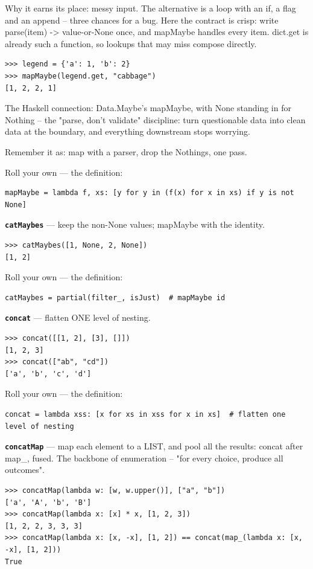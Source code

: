 \documentclass[10pt,letterpaper]{article}
\begin{document}
Why it earns its place: messy input. The alternative is a loop with an if, a flag and an append -- three chances for a bug. Here the contract is crisp: write parse(item) -> value-or-None once, and mapMaybe handles every item. dict.get is already such a function, so lookups that may miss compose directly.

\begin{lstlisting}[style=ex]
>>> legend = {'a': 1, 'b': 2}
>>> mapMaybe(legend.get, "cabbage")
[1, 2, 2, 1]
\end{lstlisting}

The Haskell connection: Data.Maybe's mapMaybe, with None standing in for Nothing -- the "parse, don't validate" discipline: turn questionable data into clean data at the boundary, and everything downstream stops worrying.


Remember it as: map with a parser, drop the Nothings, one pass.


Roll your own --- the definition:

\begin{lstlisting}[style=ex]
mapMaybe = lambda f, xs: [y for y in (f(x) for x in xs) if y is not None]
\end{lstlisting}
\textbf{\texttt{catMaybes}} --- keep the non-None values; mapMaybe with the identity.
\begin{lstlisting}[style=ex]
>>> catMaybes([1, None, 2, None])
[1, 2]
\end{lstlisting}

Roll your own --- the definition:

\begin{lstlisting}[style=ex]
catMaybes = partial(filter_, isJust)  # mapMaybe id
\end{lstlisting}
\textbf{\texttt{concat}} --- flatten ONE level of nesting.
\begin{lstlisting}[style=ex]
>>> concat([[1, 2], [3], []])
[1, 2, 3]
>>> concat(["ab", "cd"])
['a', 'b', 'c', 'd']
\end{lstlisting}

Roll your own --- the definition:

\begin{lstlisting}[style=ex]
concat = lambda xss: [x for xs in xss for x in xs]  # flatten one level of nesting
\end{lstlisting}
\textbf{\texttt{concatMap}} --- map each element to a LIST, and pool all the results: concat after map\_, fused. The backbone of enumeration -- "for every choice, produce all outcomes".
\begin{lstlisting}[style=ex]
>>> concatMap(lambda w: [w, w.upper()], ["a", "b"])
['a', 'A', 'b', 'B']
>>> concatMap(lambda x: [x] * x, [1, 2, 3])
[1, 2, 2, 3, 3, 3]
>>> concatMap(lambda x: [x, -x], [1, 2]) == concat(map_(lambda x: [x, -x], [1, 2]))
True
\end{lstlisting}
\end{document}

